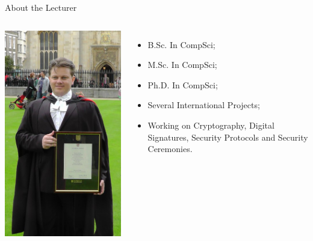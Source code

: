 \documentclass[12pt]{beamer}
\begin{document}
\begin{frame}{About the Lecturer}
\begin{columns}
\begin{center}
\includegraphics[scale=0.26]{academic_dress.jpg}
\end{center}
\begin{itemize}
\item B.Sc. In CompSci;\pause
\item M.Sc. In CompSci;\pause
\item Ph.D. In CompSci;\pause
\item Several International Projects; \pause
\item Working on Cryptography, Digital Signatures, Security Protocols and Security Ceremonies.
\end{itemize}
\end{columns}
\end{frame}
\end{document}
